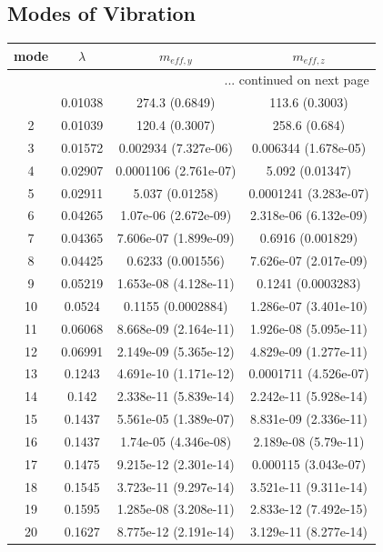 \documentclass{article}%
\begin{document}
\subsection{Modes of Vibration}%
\label{subsec:ModesofVibration}%
\begin{longtable}{| c | c | c c |}%
\hline%
mode&$\lambda$&$m_{eff,y}$&$m_{eff,z}$\\%
\hline%
\endhead%
\hline%
\multicolumn{4}{r}{... continued on next page}\\%
\endfoot%
\hline%
\endlastfoot%
1&0.01038&274.3 (0.6849)&113.6 (0.3003)\\%
2&0.01039&120.4 (0.3007)&258.6 (0.684)\\%
3&0.01572&0.002934 (7.327e{-}06)&0.006344 (1.678e{-}05)\\%
4&0.02907&0.0001106 (2.761e{-}07)&5.092 (0.01347)\\%
5&0.02911&5.037 (0.01258)&0.0001241 (3.283e{-}07)\\%
6&0.04265&1.07e{-}06 (2.672e{-}09)&2.318e{-}06 (6.132e{-}09)\\%
7&0.04365&7.606e{-}07 (1.899e{-}09)&0.6916 (0.001829)\\%
8&0.04425&0.6233 (0.001556)&7.626e{-}07 (2.017e{-}09)\\%
9&0.05219&1.653e{-}08 (4.128e{-}11)&0.1241 (0.0003283)\\%
10&0.0524&0.1155 (0.0002884)&1.286e{-}07 (3.401e{-}10)\\%
11&0.06068&8.668e{-}09 (2.164e{-}11)&1.926e{-}08 (5.095e{-}11)\\%
12&0.06991&2.149e{-}09 (5.365e{-}12)&4.829e{-}09 (1.277e{-}11)\\%
13&0.1243&4.691e{-}10 (1.171e{-}12)&0.0001711 (4.526e{-}07)\\%
14&0.142&2.338e{-}11 (5.839e{-}14)&2.242e{-}11 (5.928e{-}14)\\%
15&0.1437&5.561e{-}05 (1.389e{-}07)&8.831e{-}09 (2.336e{-}11)\\%
16&0.1437&1.74e{-}05 (4.346e{-}08)&2.189e{-}08 (5.79e{-}11)\\%
17&0.1475&9.215e{-}12 (2.301e{-}14)&0.000115 (3.043e{-}07)\\%
18&0.1545&3.723e{-}11 (9.297e{-}14)&3.521e{-}11 (9.311e{-}14)\\%
19&0.1595&1.285e{-}08 (3.208e{-}11)&2.833e{-}12 (7.492e{-}15)\\%
20&0.1627&8.775e{-}12 (2.191e{-}14)&3.129e{-}11 (8.277e{-}14)\\%
\end{longtable}

%
\end{document}
